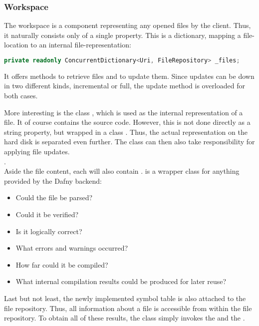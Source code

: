 \subsubsection{Workspace}
The workspace is a component representing any opened files by the client.
Thus, it naturally consists only of a single property.
This is a dictionary, mapping a file-location to an internal file-representation:

\begin{lstlisting}[language=csharp, caption={Workspace Property}, captionpos=b, label={lst:workspaceproperty}]
private readonly ConcurrentDictionary<Uri, FileRepository> _files;
\end{lstlisting}

It offers methods to retrieve files and to update them.
Since updates can be down in two different kinds, incremental or full, the update method is overloaded for both cases.

More interesting is the class , which is used as the internal representation of a file.
It of course contains the source code.
However, this is not done directly as a string property, but wrapped in a class .
Thus, the actual representation on the hard disk is separated even further.
The  class can then also take responsibility for applying file updates.\\

.\\

Aside the file content, each  will also contain .
 is a wrapper class for anything provided by the Dafny backend:
\begin{itemize}
    \item Could the file be parsed?
    \item Could it be verified?
    \item Is it logically correct?
    \item What errors and warnings occurred?
    \item How far could it be compiled?
    \item What internal compilation results could be produced for later reuse?
\end{itemize}

Last but not least, the newly implemented symbol table is also attached to the file repository.
Thus, all information about a file is accessible from within the file repository.
To obtain all of these results, the class simply invokes the  and the .

